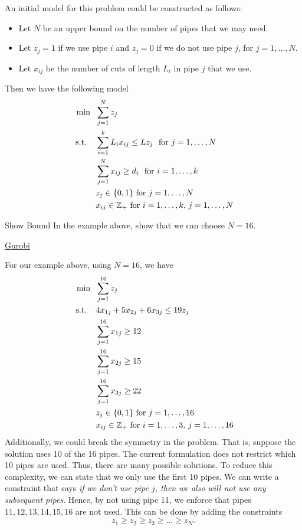 An initial model for this problem could be constructed as follows:  
\begin{itemize}
\item Let $N$ be an upper bound on the number of pipes that we may need.
\item Let $z_j = 1$ if we use pipe $i$ and $z_j = 0$ if we do not use pipe $j$, for $j=1, \dots, N$.
\item Let $x_{ij}$ be the number of cuts of length $L_i$ in pipe $j$ that we use.
\end{itemize}
Then we have the following model
\begin{equation}
\begin{split}
\min\ \  & \sum_{j=1}^N z_j\\
\mbox{ s.t. } \ \  & \sum_{i=1}^k  L_i x_{ij} \leq Lz_j \ \mbox{ for } j=1,\dots, N\\
& \sum_{j=1}^N x_{ij} \geq d_i \ \mbox{ for } i=1, \dots, k\\
& z_j \in \{0,1\} \mbox{ for } j=1, \dots, N\\
& x_{ij} \in {\mathbb{Z}}_+ \mbox{ for } i=1, \dots, k,\, j=1, \dots, N
\end{split}
\end{equation}
\begin{exercise}{Show Bound}{}
In the example above, show that we can choose $N=16$.
\end{exercise}
\begin{examplewithcode}{}{\href{https://github.com/open-optimization/open-optimization-or-examples/blob/master/integer-programming/cutting-stock.ipynb}{Gurobi}}{}{}

For our example above, using $N=16$, we have
\begin{equation}
\begin{split}
\min\ \  & \sum_{j=1}^{16} z_j\\
\mbox{ s.t. } \ \  &  4 x_{1j} + 5 x_{2j} + 6 x_{3j} \leq 19 z_j\\
& \sum_{j=1}^{16} x_{1j} \geq 12\\
& \sum_{j=1}^{16} x_{2j} \geq 15\\
& \sum_{j=1}^{16} x_{3j} \geq 22\\
& z_j \in \{0,1\} \mbox{ for } j=1, \dots, 16\\
& x_{ij} \in {\mathbb{Z}}_+ \mbox{ for } i=1, \dots, 3,\, j=1, \dots, 16
\end{split}
\end{equation}
Additionally, we could break the symmetry in the problem.  That is, suppose the solution uses 10 of the 16 pipes.  The current formulation does not restrict which 10 pipes are used.  Thus, there are many possible solutions.  To reduce this complexity, we can state that we only use the first 10 pipes.  We can write a constraint that says \emph{if we don't use pipe $j$, then we also will not use any subsequent pipes}.  Hence, by not using pipe 11, we enforce that pipes $11, 12, 13, 14,15,16$ are not used.  This can be done by adding the constraints
\begin{equation}
z_1 \geq z_2 \geq z_3 \geq \dots \geq z_N.
\end{equation}

\end{examplewithcode}

